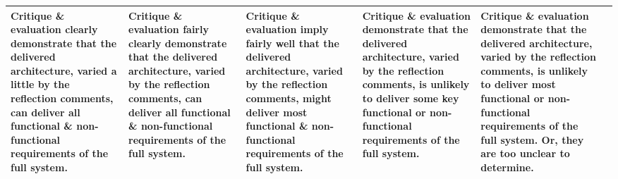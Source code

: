 \documentclass{csse4400}
\begin{document}
\begin{landscape}
\begin{xltabular}{\linewidth}{| p{1.8cm} | X | X | X | X | X |}
Critique \& evaluation clearly demonstrate that the delivered architecture, varied a little by the reflection comments, can deliver all functional \& non-functional requirements of the full system. &
Critique \& evaluation fairly clearly demonstrate that the delivered architecture, varied by the reflection comments, can deliver all functional \& non-functional requirements of the full system. &
Critique \& evaluation imply fairly well that the delivered architecture, varied by the reflection comments, might deliver most functional \& non-functional requirements of the full system. &
Critique \& evaluation demonstrate that the delivered architecture, varied by the reflection comments, is unlikely to deliver some key functional or non-functional requirements of the full system. &
Critique \& evaluation demonstrate that the delivered architecture, varied by the reflection comments, is unlikely to deliver most functional or non-functional requirements of the full system. Or, they are too unclear to determine. \\
\hline
\end{xltabular}

\clearpage
\end{landscape}




\end{document}
